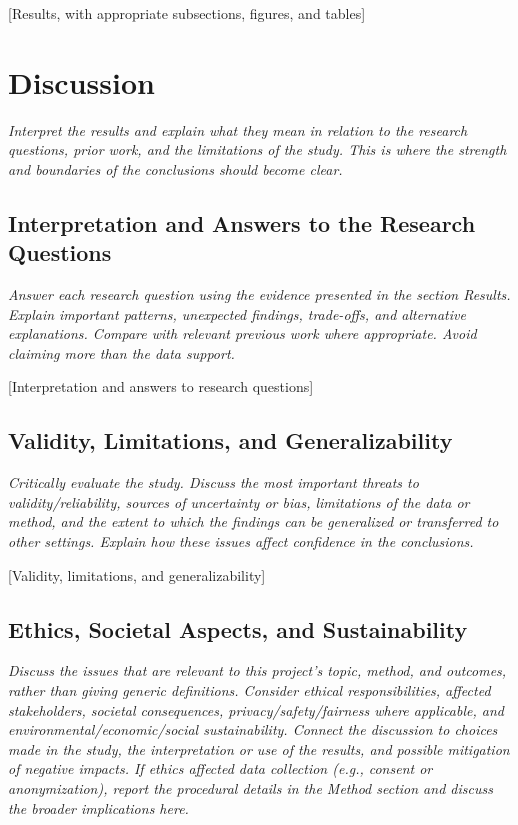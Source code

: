 \documentclass[11pt,a4paper]{article}
\newcommand{\guidance}[1]{%
  {\setstretch{1.0}\fontsize{9}{11}\selectfont\color{guidancetext}\itshape #1\par}%
  \vspace{-6pt}%
}
\newcommand{\placeholder}[1]{#1\par}
\begin{document}
\placeholder{[Results, with appropriate subsections, figures, and tables]}

\section{Discussion}

\guidance{Interpret the results and explain what they mean in relation to the research questions, prior work, and the limitations of the study. This is where the strength and boundaries of the conclusions should become clear.}

\subsection{Interpretation and Answers to the Research Questions}

\guidance{Answer each research question using the evidence presented in the section Results. Explain important patterns, unexpected findings, trade-offs, and alternative explanations. Compare with relevant previous work where appropriate. Avoid claiming more than the data support.}

\placeholder{[Interpretation and answers to research questions]}

\subsection{Validity, Limitations, and Generalizability}

\guidance{Critically evaluate the study. Discuss the most important threats to validity/reliability, sources of uncertainty or bias, limitations of the data or method, and the extent to which the findings can be generalized or transferred to other settings. Explain how these issues affect confidence in the conclusions.}

\placeholder{[Validity, limitations, and generalizability]}

\subsection{Ethics, Societal Aspects, and Sustainability}

\guidance{Discuss the issues that are relevant to this project’s topic, method, and outcomes, rather than giving generic definitions. Consider ethical responsibilities, affected stakeholders, societal consequences, privacy/safety/fairness where applicable, and environmental/economic/social sustainability. Connect the discussion to choices made in the study, the interpretation or use of the results, and possible mitigation of negative impacts. If ethics affected data collection (e.g., consent or anonymization), report the procedural details in the Method section and discuss the broader implications here.}
\end{document}
